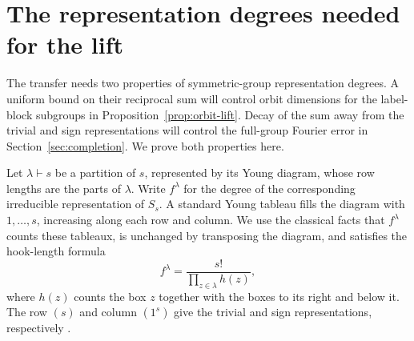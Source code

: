 \documentclass[11pt]{article}
\theoremstyle{remark}
\numberwithin{equation}{section}
\begin{document}
\section{The representation degrees needed for the lift}\label{sec:degrees}

The transfer needs two properties of symmetric-group representation degrees. A uniform bound on their reciprocal sum will control orbit dimensions for the label-block subgroups in Proposition~\ref{prop:orbit-lift}. Decay of the sum away from the trivial and sign representations will control the full-group Fourier error in Section~\ref{sec:completion}. We prove both properties here.

Let \(\lambda\vdash s\) be a partition of \(s\), represented by its Young diagram, whose row lengths are the parts of \(\lambda\). Write \(f^\lambda\) for the degree of the corresponding irreducible representation of \(S_s\). A standard Young tableau fills the diagram with \(1,\ldots,s\), increasing along each row and column. We use the classical facts that \(f^\lambda\) counts these tableaux, is unchanged by transposing the diagram, and satisfies the hook-length formula
\[
 f^\lambda=\frac{s!}{\prod_{z\in\lambda}h(z)},
\]
where $h(z)$ counts the box $z$ together with the boxes to its right
and below it. The row $(s)$ and column $(1^s)$ give the trivial and
sign representations, respectively \cite{sagan,etingof}.
\end{document}
